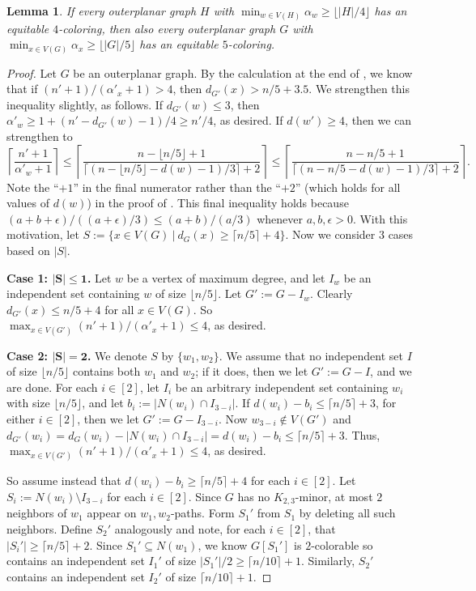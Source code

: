 \documentclass[11pt]{article}
\newtheorem{lem}{Lemma}
\theoremstyle{definition}
\newcommand\floor[1]{\lfloor#1\rfloor}
\newcommand\ceil[1]{\lceil#1\rceil}
\renewcommand\ge\geqslant
\renewcommand\le\leqslant
\begin{document}
\begin{lem}
\label{reduce-to-smallest-s-lem}
	If every outerplanar graph $H$ with $\min_{w\in V(H)}\alpha_w\ge \floor{|H|/4}$ has an equitable $4$-coloring, 
	then also every outerplanar graph $G$ with $\min_{x\in V(G)}\alpha_x\ge \floor{|G|/5}$ has an equitable $5$-coloring. 
\end{lem}

\begin{proof} 
Let $G$ be an outerplanar graph. 
	By the calculation at the end of , we know that if $(n'+1)/(\alpha'_x+1)>4$, then $d_{G'}(x) > n/5+3.5$. 
	We strengthen this inequality slightly, as follows.  If $d_{G'}(w)\le 3$, then $\alpha'_w\ge 1 + (n'-d_{G'}(w)-1)/4 \ge n'/4$, as desired.
	If $d(w') \ge 4$, then we can strengthen to
	$$
	\left\lceil\frac{n'+1}{\alpha'_w+1}\right\rceil 
	\le \left\lceil\frac{n-\floor{n/5}+1}{\ceil{(n-\floor{n/5}-d(w)-1)/3}+2}\right\rceil
	\le \left\lceil\frac{n-{n/5}+1}{\ceil{(n-{n/5}-d(w)-1)/3}+2}\right\rceil.
	$$
	Note the ``$+1$'' in the final numerator rather than the ``$+2$'' (which holds for all values of $d(w)$) in the proof of .
	This final inequality holds because $(a+b+\epsilon)/((a+\epsilon)/3) \le (a+b)/(a/3)$ whenever $a,b,\epsilon > 0$.
	With this motivation, let $S:=\{x\in V(G)~|~d_G(x) \ge \ceil{n/5} + 4\}$.  Now we consider $3$ cases based on $|S|$.

\textbf{Case 1: $\bm{|S|\le 1}$.}
Let $w$ be a vertex of maximum degree, and let $I_w$ be an independent set containing $w$ of size $\floor{n/5}$.
Let $G':= G-I_w$.  Clearly $d_{G'}(x)\le n/5+4$ for all $x\in V(G)$.  So $\max_{x\in V(G')}(n'+1)/(\alpha'_x+1)\le 4$, as desired.  

\textbf{Case 2: $\bm{|S|=2}$.}
We denote $S$ by $\{w_1,w_2\}$.  We assume that no independent set $I$ of size $\floor{n/5}$ contains both $w_1$ and $w_2$;
if it does, then we let $G':=G-I$, and we are done.
For each $i\in [2]$, let $I_i$ be an arbitrary independent set containing $w_i$ with size $\floor{n/5}$, and
let $b_i:=|N(w_i)\cap I_{3-i}|$.
If $d(w_i)-b_i\le \ceil{n/5}+3$, for either $i\in [2]$, then we let $G':=G-I_{3-i}$.
Now $w_{3-i}\notin V(G')$ and $d_{G'}(w_i) = d_G(w_i)-|N(w_i)\cap I_{3-i}| = d(w_i) - b_i \le \ceil{n/5}+3$.
Thus, $\max_{x\in V(G')}(n'+1)/(\alpha'_x+1)\le 4$, as desired.  

So assume instead that $d(w_i)-b_i \ge \ceil{n/5}+4$ for each $i\in [2]$.
Let $S_i:=N(w_i)\setminus I_{3-i}$ for each $i\in [2]$.  Since $G$ has no $K_{2,3}$-minor, at most $2$ neighbors of $w_1$ appear on $w_1,w_2$-paths.
Form $S_1'$ from $S_1$ by deleting all such neighbors.  Define $S_2'$ analogously and note, for each $i\in[2]$, that $|S_i'|\ge \ceil{n/5}+2$.
Since $S_1'\subseteq N(w_1)$, we know $G[S_1']$ is $2$-colorable so contains an independent set $I_1'$ of size $|S_1'|/2\ge \ceil{n/10}+1$.
Similarly, $S_2'$ contains an independent set $I_2'$ of size $\ceil{n/10}+1$.  


\end{proof}
\end{document}
